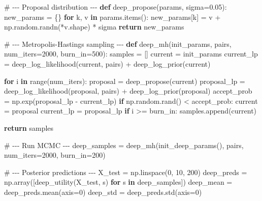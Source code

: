 \documentclass[
  letterpaper,
  numbers=noenddot,
  DIV=11]{scrreprt}
\newenvironment{Shaded}{\begin{snugshade}}{\end{snugshade}}
\newcommand{\BuiltInTok}[1]{\textcolor[rgb]{0.00,0.23,0.31}{#1}}
\newcommand{\CommentTok}[1]{\textcolor[rgb]{0.37,0.37,0.37}{#1}}
\newcommand{\ControlFlowTok}[1]{\textcolor[rgb]{0.00,0.23,0.31}{\textbf{#1}}}
\newcommand{\DecValTok}[1]{\textcolor[rgb]{0.68,0.00,0.00}{#1}}
\newcommand{\FloatTok}[1]{\textcolor[rgb]{0.68,0.00,0.00}{#1}}
\newcommand{\KeywordTok}[1]{\textcolor[rgb]{0.00,0.23,0.31}{\textbf{#1}}}
\newcommand{\NormalTok}[1]{\textcolor[rgb]{0.00,0.23,0.31}{#1}}
\newcommand{\OperatorTok}[1]{\textcolor[rgb]{0.37,0.37,0.37}{#1}}
\theoremstyle{plain}
\theoremstyle{definition}
\theoremstyle{remark}
\begin{document}
\begin{Shaded}
\begin{Highlighting}[numbers=left,,]
\CommentTok{\# {-}{-}{-} Proposal distribution {-}{-}{-}}
\KeywordTok{def}\NormalTok{ deep\_propose(params, sigma}\OperatorTok{=}\FloatTok{0.05}\NormalTok{):}
\NormalTok{    new\_params }\OperatorTok{=}\NormalTok{ \{\}}
    \ControlFlowTok{for}\NormalTok{ k, v }\KeywordTok{in}\NormalTok{ params.items():}
\NormalTok{        new\_params[k] }\OperatorTok{=}\NormalTok{ v }\OperatorTok{+}\NormalTok{ np.random.randn(}\OperatorTok{*}\NormalTok{v.shape) }\OperatorTok{*}\NormalTok{ sigma}
    \ControlFlowTok{return}\NormalTok{ new\_params}

\CommentTok{\# {-}{-}{-} Metropolis{-}Hastings sampling {-}{-}{-}}
\KeywordTok{def}\NormalTok{ deep\_mh(init\_params, pairs, num\_iters}\OperatorTok{=}\DecValTok{2000}\NormalTok{, burn\_in}\OperatorTok{=}\DecValTok{500}\NormalTok{):}
\NormalTok{    samples }\OperatorTok{=}\NormalTok{ []}
\NormalTok{    current }\OperatorTok{=}\NormalTok{ init\_params}
\NormalTok{    current\_lp }\OperatorTok{=}\NormalTok{ deep\_log\_likelihood(current, pairs) }\OperatorTok{+}\NormalTok{ deep\_log\_prior(current)}

    \ControlFlowTok{for}\NormalTok{ i }\KeywordTok{in} \BuiltInTok{range}\NormalTok{(num\_iters):}
\NormalTok{        proposal }\OperatorTok{=}\NormalTok{ deep\_propose(current)}
\NormalTok{        proposal\_lp }\OperatorTok{=}\NormalTok{ deep\_log\_likelihood(proposal, pairs) }\OperatorTok{+}\NormalTok{ deep\_log\_prior(proposal)}
\NormalTok{        accept\_prob }\OperatorTok{=}\NormalTok{ np.exp(proposal\_lp }\OperatorTok{{-}}\NormalTok{ current\_lp)}
        \ControlFlowTok{if}\NormalTok{ np.random.rand() }\OperatorTok{\textless{}}\NormalTok{ accept\_prob:}
\NormalTok{            current }\OperatorTok{=}\NormalTok{ proposal}
\NormalTok{            current\_lp }\OperatorTok{=}\NormalTok{ proposal\_lp}
        \ControlFlowTok{if}\NormalTok{ i }\OperatorTok{\textgreater{}=}\NormalTok{ burn\_in:}
\NormalTok{            samples.append(current)}

    \ControlFlowTok{return}\NormalTok{ samples}

\CommentTok{\# {-}{-}{-} Run MCMC {-}{-}{-}}
\NormalTok{deep\_samples }\OperatorTok{=}\NormalTok{ deep\_mh(init\_deep\_params(), pairs, num\_iters}\OperatorTok{=}\DecValTok{2000}\NormalTok{, burn\_in}\OperatorTok{=}\DecValTok{200}\NormalTok{)}

\CommentTok{\# {-}{-}{-} Posterior predictions {-}{-}{-}}
\NormalTok{X\_test }\OperatorTok{=}\NormalTok{ np.linspace(}\DecValTok{0}\NormalTok{, }\DecValTok{10}\NormalTok{, }\DecValTok{200}\NormalTok{)}
\NormalTok{deep\_preds }\OperatorTok{=}\NormalTok{ np.array([deep\_utility(X\_test, s) }\ControlFlowTok{for}\NormalTok{ s }\KeywordTok{in}\NormalTok{ deep\_samples])}
\NormalTok{deep\_mean }\OperatorTok{=}\NormalTok{ deep\_preds.mean(axis}\OperatorTok{=}\DecValTok{0}\NormalTok{)}
\NormalTok{deep\_std }\OperatorTok{=}\NormalTok{ deep\_preds.std(axis}\OperatorTok{=}\DecValTok{0}\NormalTok{)}


\end{Highlighting}
\end{Shaded}
\end{document}
